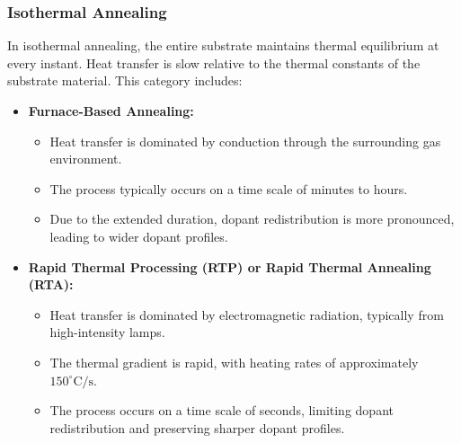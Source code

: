 \documentclass{report}
\begin{document}
\subsubsection{Isothermal Annealing}
In isothermal annealing, the entire substrate maintains thermal equilibrium at every instant. Heat transfer is slow relative to the thermal constants of the substrate material. This category includes:
\begin{itemize}
    \item \textbf{Furnace-Based Annealing:} 
    \begin{itemize}
        \item Heat transfer is dominated by conduction through the surrounding gas environment.
        \item The process typically occurs on a time scale of minutes to hours.
        \item Due to the extended duration, dopant redistribution is more pronounced, leading to wider dopant profiles.
    \end{itemize}
    \item \textbf{Rapid Thermal Processing (RTP) or Rapid Thermal Annealing (RTA):}
    \begin{itemize}
        \item Heat transfer is dominated by electromagnetic radiation, typically from high-intensity lamps.
        \item The thermal gradient is rapid, with heating rates of approximately $150^{\circ}\text{C}/\text{s}$.
        \item The process occurs on a time scale of seconds, limiting dopant redistribution and preserving sharper dopant profiles.
    \end{itemize}
\end{itemize}
\end{document}
